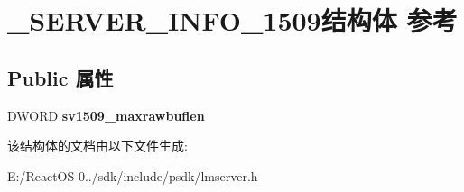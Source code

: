 \hypertarget{struct___s_e_r_v_e_r___i_n_f_o__1509}{}\section{\+\_\+\+S\+E\+R\+V\+E\+R\+\_\+\+I\+N\+F\+O\+\_\+1509结构体 参考}
\label{struct___s_e_r_v_e_r___i_n_f_o__1509}
\subsection*{Public 属性}
\begin{DoxyCompactItemize}
\item 
\mbox{\label{struct___s_e_r_v_e_r___i_n_f_o__1509_aad92fafe241e8654be56b7c6d4864d11}} 
D\+W\+O\+RD {\bfseries sv1509\+\_\+maxrawbuflen}
\end{DoxyCompactItemize}


该结构体的文档由以下文件生成\+:\begin{DoxyCompactItemize}
\item 
E\+:/\+React\+O\+S-\/0../sdk/include/psdk/lmserver.\+h\end{DoxyCompactItemize}
